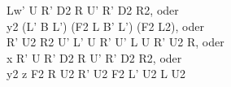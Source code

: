 Lw' U R' D2 R U' R' D2 R2, oder\\
y2 (L' B L') (F2 L B' L') (F2 L2), oder\\
R' U2 R2 U' L' U R' U' L U R' U2 R, oder\\
x R' U R' D2 R U' R' D2 R2, oder\\
y2 z F2 R U2 R' U2 F2 L' U2 L U2\\
